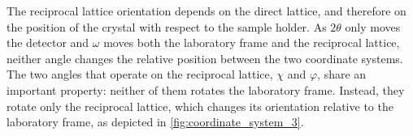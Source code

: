 The reciprocal lattice orientation depends on the direct lattice, and therefore
on the position of the crystal with respect to the sample holder. As $2\theta$ only
moves the detector and $\omega$ moves both the laboratory frame and the reciprocal
lattice, neither angle changes the relative position between the two coordinate
systems. The two angles that operate on the reciprocal lattice, $\chi$ and
$\varphi$, share an important property: neither of them rotates the laboratory
frame. Instead, they rotate only the reciprocal lattice, which changes its orientation
relative to the laboratory frame, as depicted in \cref{fig:coordinate_system_3}.